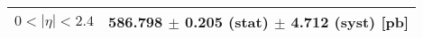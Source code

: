 \begin{tabular}{lc}
\hline
$0 < |\eta| <2.4$              & 586.798 $\pm$ 0.205 (stat) $\pm$ 4.712 (syst) [pb]  \\
\hline
\end{tabular}
